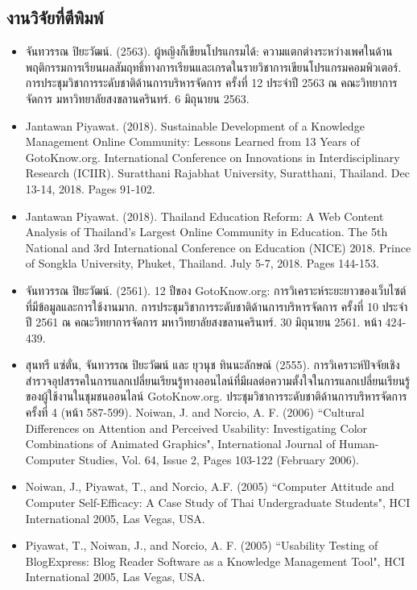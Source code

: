 \begin{appendices}
\section*{งานวิจัยที่ตีพิมพ์}

\begin{itemize}
	\item จันทวรรณ ปิยะวัฒน์. (2563). ผู้หญิงก็เขียนโปรแกรมได้: ความแตกต่างระหว่างเพศในด้านพฤติกรรมการเรียนผลสัมฤทธิ์ทางการเรียนและเกรดในรายวิชาการเขียนโปรแกรมคอมพิวเตอร์. การประชุมวิชาการระดับชาติด้านการบริหารจัดการ ครั้งที่ 12 ประจำปี 2563 ณ คณะวิทยาการจัดการ มหาวิทยาลัยสงขลานครินทร์. 6 มิถุนายน 2563.
	\item Jantawan Piyawat. (2018). Sustainable Development of a Knowledge Management Online Community: Lessons Learned from 13 Years of GotoKnow.org. International Conference on Innovations in Interdisciplinary Research (ICIIR). Suratthani Rajabhat University, Suratthani, Thailand. Dec 13-14, 2018. Pages 91-102.
	\item Jantawan Piyawat. (2018). Thailand Education Reform: A Web Content Analysis of Thailand’s Largest Online Community in Education. The 5th National and 3rd International Conference on Education (NICE) 2018. Prince of Songkla University, Phuket, Thailand. July 5-7, 2018. Pages 144-153.
	\item จันทวรรณ ปิยะวัฒน์. (2561). 12 ปีของ GotoKnow.org: การวิเคราะห์ระยะยาวของเว็บไซต์ที่มีข้อมูลและการใช้งานมาก. การประชุมวิชาการระดับชาติด้านการบริหารจัดการ ครั้งที่ 10 ประจำปี 2561 ณ คณะวิทยาการจัดการ มหาวิทยาลัยสงขลานครินทร์. 30 มิถุนายน 2561. หน้า 424-439. 
	\item สุนทรี แซ่ตั่น, จันทวรรณ ปิยะวัฒน์ และ ยุวนุช ทินนะลักษณ์ (2555). การวิเคราะห์ปัจจัยเชิงสำรวจอุปสรรคในการแลกเปลี่ยนเรียนรู้ทางออนไลน์ที่มีผลต่อความตั้งใจในการแลกเปลี่ยนเรียนรู้ของผู้ใช้งานในชุมชนออนไลน์ GotoKnow.org. ประชุมวิชาการระดับชาติด้านการบริหารจัดการ ครั้งที่ 4 (หน้า 587-599).
Noiwan, J. and Norcio, A. F. (2006) “Cultural Differences on Attention and Perceived Usability: Investigating Color Combinations of Animated Graphics", International Journal of Human-Computer Studies, Vol. 64, Issue 2, Pages 103-122 (February 2006).
	\item Noiwan, J., Piyawat, T., and Norcio, A.F. (2005) “Computer Attitude and Computer Self-Efficacy: A Case Study of Thai Undergraduate Students", HCI International 2005, Las Vegas, USA.
	\item Piyawat, T., Noiwan, J., and Norcio, A. F. (2005) “Usability Testing of BlogExpress: Blog Reader Software as a Knowledge Management Tool", HCI International 2005, Las Vegas, USA.

\end{itemize}
\end{appendices}
